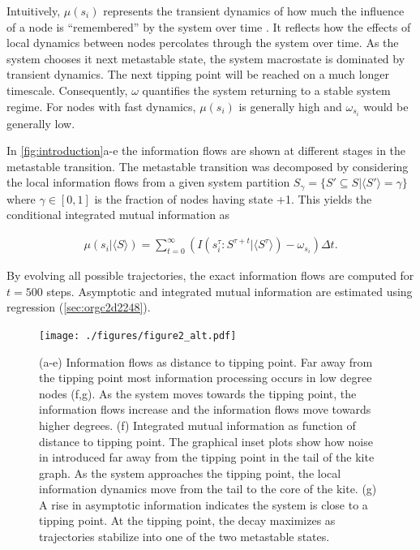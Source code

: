 \documentclass[a4paper, 11pt, twocolumn]{article}
\begin{document}
Intuitively, \(\mu(s_i)\) represents the transient dynamics of
how  much the  influence of  a node  is ``remembered''  by the
system over  time \cite{vanElteren2022}.  It reflects  how the
effects of  local dynamics between nodes  percolates through
the  system  over  time.  As  the  system  chooses  it  next
metastable  state, the  system  macrostate  is dominated  by
transient dynamics.  The next tipping point  will be reached
on a  much longer timescale. Consequently,  \(\omega\) quantifies
the system  returning to a  stable system regime.  For nodes
with  fast  dynamics,  \(\mu(s_i)\)   is  generally  high  and
\(\omega_{s_i}\) would be generally low.

In  \cref{fig:introduction}{a-e} the  information flows  are
shown at different stages  in the metastable transition. The
metastable  transition  was  decomposed by  considering  the
local  information  flows  from  a  given  system  partition
\(S_{\gamma} = \{S' \subseteq  S | \langle S' \rangle = \gamma\}\) where  \(\gamma \in [0,1]\) is
the  fraction of  nodes  having state  +1.  This yields  the
conditional integrated mutual information as

\begin{equation}
\label{eq:adj_imi_conditional}
\begin{split}
\mu(s_i  | \langle  S \rangle) =  \sum_{t = 0}^\infty (I(s_i^{\tau} : S^{\tau + t} | \langle S^{\tau} \rangle) - \omega_{s_i}) \Delta t.
\end{split}
\end{equation}

By evolving all possible trajectories, the exact information
flows  are  computed  for \(t=500\)  steps.  Asymptotic  and
integrated mutual information are estimated using regression
(\ref{sec:orgc2d2248}).

\begin{figure}[th]
\centering
\texttt{[image: ./figures/figure2\_alt.pdf]}
\caption{\label{fig:kite_res}(a-e) Information flows as distance to tipping point. Far away from the tipping point most information processing occurs in low degree nodes (f,g). As the system moves towards the tipping point, the information flows increase and the information flows move towards higher degrees. (f) Integrated mutual information as function of distance to tipping point. The graphical inset plots show how noise in introduced far away from the tipping point in the tail of the kite graph. As the system approaches the tipping point, the local information dynamics move from the tail to the core of the kite. (g) A rise in asymptotic information indicates the system is close to a tipping point. At the tipping point, the decay maximizes as trajectories stabilize into one of the two metastable states.}
\end{figure}
\end{document}
